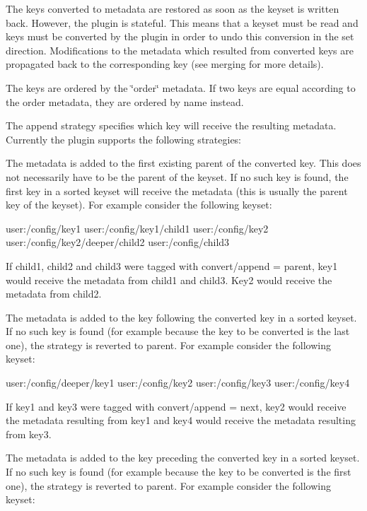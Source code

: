 The keys converted to metadata are restored as soon as the keyset is written back. However, the plugin is stateful. This means that a keyset must be read and keys must be converted by the plugin in order to undo this conversion in the set direction. Modifications to the metadata which resulted from converted keys are propagated back to the corresponding key (see merging for more details).

The keys are ordered by the \char`\"{}order\char`\"{} metadata. If two keys are equal according to the order metadata, they are ordered by name instead.

The append strategy specifies which key will receive the resulting metadata. Currently the plugin supports the following strategies\+:

The metadata is added to the first existing parent of the converted key. This does not necessarily have to be the parent of the keyset. If no such key is found, the first key in a sorted keyset will receive the metadata (this is usually the parent key of the keyset). For example consider the following keyset\+:


\begin{DoxyCode}
user:/config/key1
user:/config/key1/child1
user:/config/key2
user:/config/key2/deeper/child2
user:/config/child3
\end{DoxyCode}


If child1, child2 and child3 were tagged with {\ttfamily convert/append = parent}, key1 would receive the metadata from child1 and child3. Key2 would receive the metadata from child2.

The metadata is added to the key following the converted key in a sorted keyset. If no such key is found (for example because the key to be converted is the last one), the strategy is reverted to parent. For example consider the following keyset\+:


\begin{DoxyCode}
user:/config/deeper/key1
user:/config/key2
user:/config/key3
user:/config/key4
\end{DoxyCode}


If key1 and key3 were tagged with {\ttfamily convert/append = next}, key2 would receive the metadata resulting from key1 and key4 would receive the metadata resulting from key3.

The metadata is added to the key preceding the converted key in a sorted keyset. If no such key is found (for example because the key to be converted is the first one), the strategy is reverted to parent. For example consider the following keyset\+:


